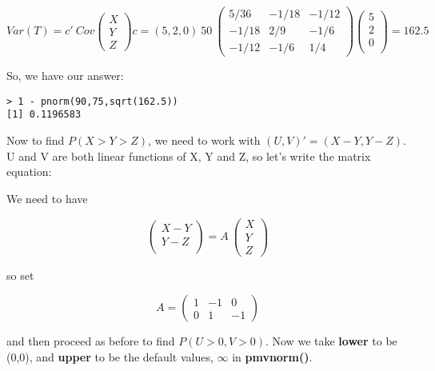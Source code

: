 \begin{equation}
Var(T) =
c' ~ Cov
\left (
\begin{array}{c}
X \\
Y \\
Z 
\end{array}
\right )
c
=
(5,2,0) ~
50 ~
\left (
\begin{array}{rrr}
5/36 & -1/18 & -1/12 \\
-1/18 & 2/9 & -1/6 \\
-1/12 & -1/6 & 1/4 
\end{array}
\right )
\left (
\begin{array}{r}
5 \\
2 \\
0 \\
\end{array}
\right )
= 162.5
\end{equation}

So, we have our answer:

\begin{lstlisting}
> 1 - pnorm(90,75,sqrt(162.5))
[1] 0.1196583
\end{lstlisting}

Now to find $P(X > Y > Z)$, we need to work with $(U,V)' = (X-Y,Y-Z)$. 
U and V are both linear functions of X, Y and Z, so let's write the
matrix equation:

We need to have

\begin{equation}
\left (
\begin{array}{r}
X-Y \\
Y-Z \\
\end{array}
\right )
=
A ~
\left (
\begin{array}{c}
X \\
Y \\
Z 
\end{array}
\right )
\end{equation}

so set

\begin{equation}
   A = 
      \left (
      \begin{array}{rrr}
      1 & -1 & 0\\
      0 & 1 & -1   
      \end{array}
      \right )     
\end{equation}

and then proceed as before to find $P(U > 0, V > 0)$.  Now we take
{\bf lower} to be (0,0), and {\bf upper} to be the default values,
$\infty$ in {\bf pmvnorm()}.

